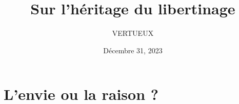\documentclass[]{cls/tools}
\begin{document}
\title{Sur l'héritage du libertinage}

\author{VERTUEUX}
\date{Décembre 31, 2023}

\maketitle

\section*{L'envie ou la raison ?}
\end{document}

